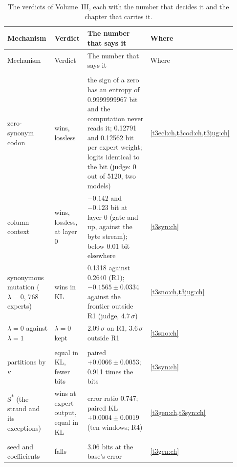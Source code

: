 \begingroup\footnotesize
\setlength{\tabcolsep}{4pt}
\begin{longtable}{@{}>{\raggedright\arraybackslash}p{0.25\linewidth}>{\raggedright\arraybackslash}p{0.17\linewidth}>{\raggedright\arraybackslash}p{0.40\linewidth}>{\raggedright\arraybackslash}p{0.11\linewidth}@{}}
\caption[The verdicts of Volume~III]{The verdicts of Volume~III, each with the number that decides it and the chapter that carries it.}\label{t3dis:tab:verdicts}\\
\toprule
Mechanism & Verdict & The number that says it & Where \\
\midrule
\endfirsthead
\toprule
Mechanism & Verdict & The number that says it & Where \\
\midrule
\endhead
\multicolumn{4}{@{}l}{\textsf{\bfseries They win (the synonyms)}} \\
zero-synonym codon & wins, lossless & the sign of a zero has an entropy of 0.9999999967 bit and the computation never reads it; \num{0.12791} and \num{0.12562} bit per expert weight; logits identical to the bit (judge: 0 out of \num{5120}, two models) & \cref{t3ecl:ch,t3cod:ch,t3jug:ch} \\
column context & wins, lossless, at layer 0 & $-\num{0.142}$ and $-\num{0.123}$ bit at layer 0 (gate and up, against the byte stream); below \num{0.01} bit elsewhere & \cref{t3syn:ch} \\
synonymous mutation ($\lambda = 0$, 768 experts) & wins in KL & \num{0.1318} against \num{0.2640} (R1); $-\num{0.1565} \pm \num{0.0334}$ against the frontier outside R1 (judge, \num{4.7}\,$\sigma$) & \cref{t3sno:ch,t3jug:ch} \\
$\lambda = 0$ against $\lambda = 1$ & $\lambda = 0$ kept & \num{2.09}\,$\sigma$ on R1, \num{3.6}\,$\sigma$ outside R1 & \cref{t3sno:ch} \\
\multicolumn{4}{@{}l}{\textsf{\bfseries Equal}} \\
partitions by $\kappa$ & equal in KL, fewer bits & paired $+\num{0.0066} \pm \num{0.0053}$; \num{0.911} times the bits & \cref{t3syn:ch} \\
S\textsuperscript{*} (the strand and its exceptions) & wins at expert output, equal in KL & error ratio \num{0.747}; paired KL $+\num{0.0004} \pm \num{0.0019}$ (ten windows; R4) & \cref{t3gen:ch,t3syn:ch} \\
\multicolumn{4}{@{}l}{\textsf{\bfseries They fall}} \\
seed and coefficients & falls & \num{3.06} bits at the base's error & \cref{t3gen:ch} \\

\end{longtable}
